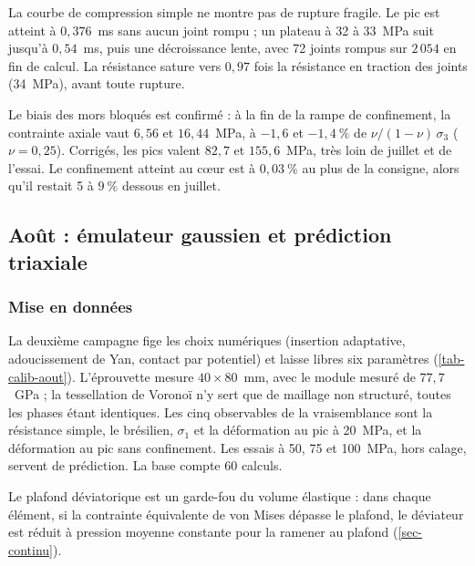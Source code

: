 La courbe de compression simple ne montre pas de rupture fragile. Le pic est atteint à $0{,}376$~ms sans aucun joint rompu ; un plateau à 32 à 33~MPa suit jusqu'à $0{,}54$~ms, puis une décroissance lente, avec 72 joints rompus sur $2\,054$ en fin de calcul. La résistance sature vers $0{,}97$ fois la résistance en traction des joints (34~MPa), avant toute rupture.

Le biais des mors bloqués est confirmé : à la fin de la rampe de confinement, la contrainte axiale vaut $6{,}56$ et $16{,}44$~MPa, à $-1{,}6$ et $-1{,}4~\%$ de $\nu/(1-\nu)\,\sigma_3$ ($\nu = 0{,}25$). Corrigés, les pics valent $82{,}7$ et $155{,}6$~MPa, très loin de juillet et de l'essai. Le confinement atteint au cœur est à $0{,}03~\%$ au plus de la consigne, alors qu'il restait 5 à $9~\%$ dessous en juillet.

\subsection{Août : émulateur gaussien et prédiction triaxiale}

\subsubsection{Mise en données}

La deuxième campagne fige les choix numériques (insertion adaptative, adoucissement de Yan, contact par potentiel) et laisse libres six paramètres (\cref{tab-calib-aout}). L'éprouvette mesure $40 \times 80$~mm, avec le module mesuré de $77{,}7$~GPa ; la tessellation de Voronoï n'y sert que de maillage non structuré, toutes les phases étant identiques. Les cinq observables de la vraisemblance sont la résistance simple, le brésilien, $\sigma_1$ et la déformation au pic à 20~MPa, et la déformation au pic sans confinement. Les essais à 50, 75 et 100~MPa, hors calage, servent de prédiction. La base compte 60 calculs.

Le plafond déviatorique est un garde-fou du volume élastique : dans chaque élément, si la contrainte équivalente de von Mises dépasse le plafond, le déviateur est réduit à pression moyenne constante pour la ramener au plafond (\cref{sec-continu}).

